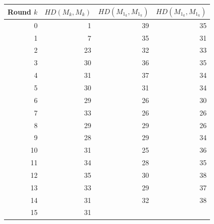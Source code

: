 \begin{table}[T]
\centering
\begin{tabular}{rr|rr}
Round $k$ & $HD(M_k,M_k)$ &  $HD(M_{1_k},M_{1_k})$ & $HD(M_{1_k},M_{1_k})$ \\ \hline
 0 &1 & 39 & 35 \\
 1 &7 &35 &31      \\
 2 &23 &32 &33     \\ 
 3 &30 &36 &35     \\
 4 &31 &37 &34     \\
 5 &30 &31 &34     \\
 6 &29 &26 &30     \\
 7 &33 &26 &26     \\
 8 &29 &29 &26     \\
 9 &28 &29 &34     \\
10 &31 &25 &36     \\
11 &34 &28 &35     \\
12 &35 &30 &38     \\
13 &33 &29 &37     \\
14 &31 &32 &38     \\
15 &31
\\ \hline								
\end{tabular}
\end{table}